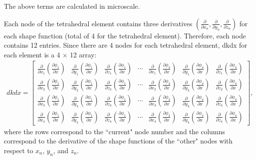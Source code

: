 %
The above terms are calculated in microscale. %

Each node of the tetrahedral element contains three derivatives $(\frac{\partial}{\partial x_n}, \frac{\partial}{\partial y_n}, \frac{\partial}{\partial z_n})$ for each shape function (total of 4 for the tetrahedral element). Therefore, each node contains 12 entries. Since there are 4 nodes for each tetrahedral element, dkdx for each element is a 4 $\times$ 12 array:
%
\begin{eqnarray}
dkdx = 
%
\begin{bmatrix}
\frac{\partial}{\partial x_1}\left(\frac{\partial \phi_1}{\partial x}\right) & \frac{\partial}{\partial y_1}\left(\frac{\partial \phi_1}{\partial x}\right) & \frac{\partial}{\partial z_1}\left(\frac{\partial \phi_1}{\partial x}\right) & \cdots &\frac{\partial}{\partial x_1}\left(\frac{\partial \phi_4}{\partial x}\right) & \frac{\partial}{\partial y_1}\left(\frac{\partial \phi_4}{\partial x}\right) & \frac{\partial}{\partial z_1}\left(\frac{\partial \phi_4}{\partial x}\right) \\
\frac{\partial}{\partial x_2}\left(\frac{\partial \phi_1}{\partial x}\right) & \frac{\partial}{\partial y_2}\left(\frac{\partial \phi_1}{\partial x}\right) & \frac{\partial}{\partial z_2}\left(\frac{\partial \phi_1}{\partial x}\right) & \cdots &\frac{\partial}{\partial x_2}\left(\frac{\partial \phi_4}{\partial x}\right) & \frac{\partial}{\partial y_2}\left(\frac{\partial \phi_4}{\partial x}\right) & \frac{\partial}{\partial z_2}\left(\frac{\partial \phi_4}{\partial x}\right) \\
\frac{\partial}{\partial x_3}\left(\frac{\partial \phi_1}{\partial x}\right) & \frac{\partial}{\partial y_3}\left(\frac{\partial \phi_1}{\partial x}\right) & \frac{\partial}{\partial z_3}\left(\frac{\partial \phi_1}{\partial x}\right) & \cdots &\frac{\partial}{\partial x_3}\left(\frac{\partial \phi_4}{\partial x}\right) & \frac{\partial}{\partial y_3}\left(\frac{\partial \phi_4}{\partial x}\right) & \frac{\partial}{\partial z_3}\left(\frac{\partial \phi_4}{\partial x}\right) \\
\frac{\partial}{\partial x_4}\left(\frac{\partial \phi_1}{\partial x}\right) & \frac{\partial}{\partial y_4}\left(\frac{\partial \phi_1}{\partial x}\right) & \frac{\partial}{\partial z_4}\left(\frac{\partial \phi_1}{\partial x}\right) & \cdots & \frac{\partial}{\partial x_4}\left(\frac{\partial \phi_4}{\partial x}\right) & \frac{\partial}{\partial y_4}\left(\frac{\partial \phi_4}{\partial x}\right) & \frac{\partial}{\partial z_4}\left(\frac{\partial \phi_4}{\partial x}\right)
\end{bmatrix},
\end{eqnarray}
%
where the rows correspond to the ``current" node number and the columns correspond to the derivative of the shape functions of the ``other" nodes with respect to $x_n$, $y_n$, and $z_n$.


